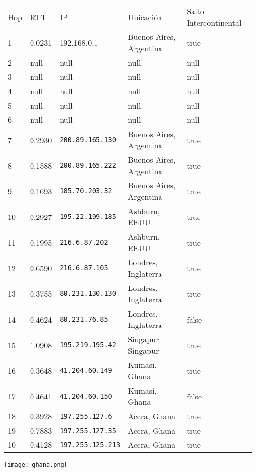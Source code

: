 \begin{tabular}{l | l | l | l | l}
Hop & RTT & IP & Ubicación & Salto Intercontinental\\
1 & 0.0231 & 192.168.0.1 & Buenos Aires, Argentina & true\\
2 & null & null & null & null\\
3 & null & null & null & null\\
4 & null & null & null & null\\
5 & null & null & null & null\\
6 & null & null & null & null\\
7 & 0.2930 & \texttt{200.89.165.130} & Buenos Aires, Argentina & true\\
8 & 0.1588 & \texttt{200.89.165.222} & Buenos Aires, Argentina & true\\
9 & 0.1693 & \texttt{185.70.203.32} & Buenos Aires, Argentina & true\\
10 & 0.2927 & \texttt{195.22.199.185} & Ashburn, EEUU & true\\
11 & 0.1995 & \texttt{216.6.87.202} & Ashburn, EEUU & true\\
12 & 0.6590 & \texttt{216.6.87.105} & Londres, Inglaterra & true\\
13 & 0.3755 & \texttt{80.231.130.130} & Londres, Inglaterra & true\\
14 & 0.4624 & \texttt{80.231.76.85} & Londres, Inglaterra & false\\
15 & 1.0908 & \texttt{195.219.195.42} & Singapur, Singapur & true\\
16 & 0.3648 & \texttt{41.204.60.149} & Kumasi, Ghana & true\\
17 & 0.4641 & \texttt{41.204.60.150} & Kumasi, Ghana & false\\
18 & 0.3928 & \texttt{197.255.127.6} & Accra, Ghana & true\\
19 & 0.7883 & \texttt{197.255.127.35} & Accra, Ghana & true\\
10 & 0.4128 & \texttt{197.255.125.213} & Accra, Ghana & true\\
\end{tabular}

\texttt{[image: ghana.png]}